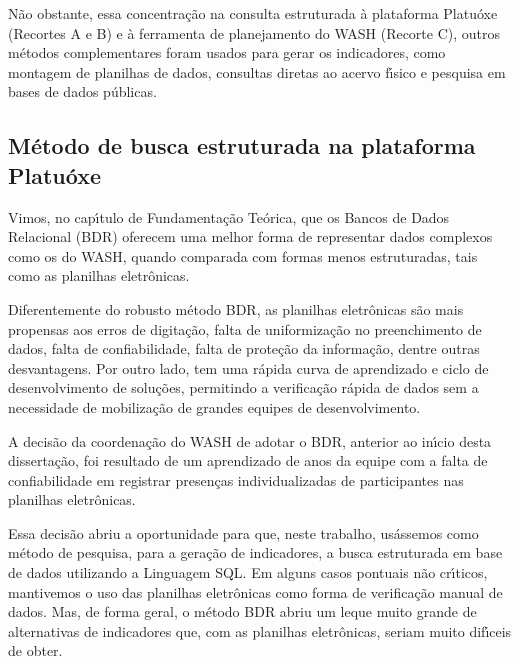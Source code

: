 \documentclass[
12pt,		%
openright,	%
twoside,  %
a4paper,			%
chapter=TITLE,		%
english,			%
french,				%
spanish,			%
brazil				%
]{USPSC-classe/USPSC}
\begin{document}
N\~ao obstante, essa concentra\c{c}\~ao na consulta estruturada \`a plataforma Platu\'oxe (Recortes A e B) e \`a ferramenta de planejamento do WASH (Recorte C), outros m\'etodos complementares foram usados para gerar os indicadores, como montagem de planilhas de dados, consultas diretas ao acervo f\'{\i}sico e pesquisa em bases de dados p\'ublicas.









\subsection[M\'etodo de busca estruturada na plataforma Platu\'oxe]{M\'etodo de busca estruturada na plataforma Platu\'oxe}\label{M\'etodo de busca estruturada na plataforma Platu\'oxe}
Vimos, no cap\'{\i}tulo de Fundamenta\c{c}\~ao Te\'orica, que os Bancos de Dados Relacional (BDR) oferecem uma melhor forma de representar dados complexos como os do WASH, quando comparada com formas menos estruturadas, tais como as planilhas eletr\^onicas.









Diferentemente do robusto m\'etodo BDR, as planilhas eletr\^onicas s\~ao mais propensas aos erros de digita\c{c}\~ao, falta de uniformiza\c{c}\~ao no preenchimento de dados, falta de confiabilidade, falta de prote\c{c}\~ao da informa\c{c}\~ao, dentre outras desvantagens. Por outro lado, tem uma r\'apida curva de aprendizado e ciclo de desenvolvimento de solu\c{c}\~oes, permitindo a verifica\c{c}\~ao r\'apida de dados sem a necessidade de mobiliza\c{c}\~ao de grandes equipes de desenvolvimento.









A decis\~ao da coordena\c{c}\~ao do WASH de adotar o BDR, anterior ao in\'{\i}cio desta disserta\c{c}\~ao, foi resultado de um aprendizado de anos da equipe com a falta de confiabilidade em registrar presen\c{c}as individualizadas de participantes nas planilhas eletr\^onicas.









Essa decis\~ao abriu a oportunidade para que, neste trabalho, us\'assemos como m\'etodo de pesquisa, para a gera\c{c}\~ao de indicadores, a busca estruturada em base de dados utilizando a Linguagem SQL. Em alguns casos pontuais n\~ao cr\'{\i}ticos, mantivemos o uso das planilhas eletr\^onicas como forma de verifica\c{c}\~ao \textquotedbl manual \textquotedbl  de dados. Mas, de forma geral, o m\'etodo BDR abriu um leque muito grande de alternativas de indicadores que, com as planilhas eletr\^onicas, seriam muito dif\'{\i}ceis de obter.
\end{document}
